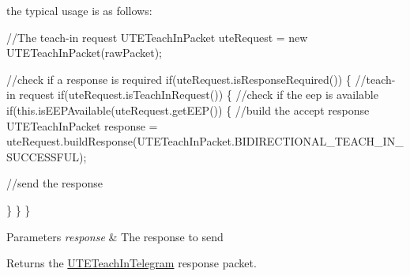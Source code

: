 the typical usage is as follows\+:~\newline



\begin{DoxyPre}
//The teach-in request
UTETeachInPacket uteRequest = new UTETeachInPacket(rawPacket);\end{DoxyPre}



\begin{DoxyPre}//check if a response is required
if(uteRequest.isResponseRequired())
\{
        //teach-in request
        if(uteRequest.isTeachInRequest())
        \{
            //check if the eep is available
        if(this.isEEPAvailable(uteRequest.getEEP())
        \{
            //build the accept response
            UTETeachInPacket response = uteRequest.buildResponse(UTETeachInPacket.BIDIRECTIONAL\_TEACH\_IN\_SUCCESSFUL);\end{DoxyPre}



\begin{DoxyPre}            //send the response\end{DoxyPre}



\begin{DoxyPre}        \}
        \}
\}
\end{DoxyPre}



\begin{DoxyParams}{Parameters}
{\em response} & The response to send \\
\hline
\end{DoxyParams}
\begin{DoxyReturn}{Returns}
the \hyperlink{classit_1_1polito_1_1elite_1_1enocean_1_1enj_1_1eep_1_1eep26_1_1telegram_1_1_u_t_e_teach_in_telegram}{U\+T\+E\+Teach\+In\+Telegram} response packet. 
\end{DoxyReturn}
\hypertarget{classit_1_1polito_1_1elite_1_1enocean_1_1enj_1_1eep_1_1eep26_1_1telegram_1_1_u_t_e_teach_in_telegram_ad14f47f2bdfc81314bc1ce6a637e16ca}{}\label{classit_1_1polito_1_1elite_1_1enocean_1_1enj_1_1eep_1_1eep26_1_1telegram_1_1_u_t_e_teach_in_telegram_ad14f47f2bdfc81314bc1ce6a637e16ca} 
